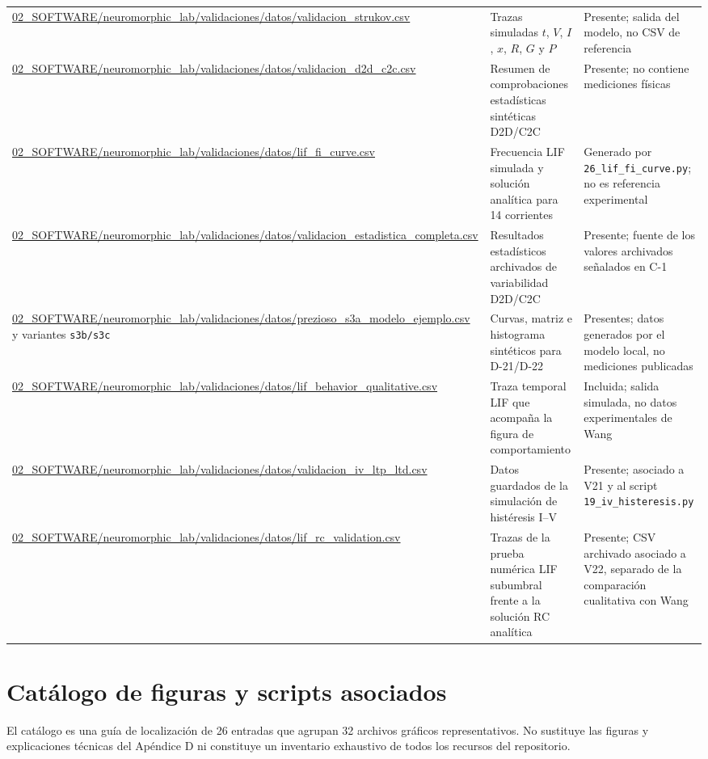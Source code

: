 \begin{longtable}{>{\raggedright\arraybackslash}p{3.8cm} >{\raggedright\arraybackslash}p{4.4cm} >{\raggedright\arraybackslash}p{5.2cm}}
\url{02_SOFTWARE/neuromorphic_lab/validaciones/datos/validacion_strukov.csv} &
Trazas simuladas $t$, $V$, $I$, $x$, $R$, $G$ y $P$ &
Presente; salida del modelo, no CSV de referencia \\
\url{02_SOFTWARE/neuromorphic_lab/validaciones/datos/validacion_d2d_c2c.csv} &
Resumen de comprobaciones estadísticas sintéticas D2D/C2C &
Presente; no contiene mediciones físicas \\
\url{02_SOFTWARE/neuromorphic_lab/validaciones/datos/lif_fi_curve.csv} &
Frecuencia LIF simulada y solución analítica para 14 corrientes &
Generado por \texttt{26\_lif\_fi\_curve.py}; no es referencia experimental \\
\url{02_SOFTWARE/neuromorphic_lab/validaciones/datos/validacion_estadistica_completa.csv} &
Resultados estadísticos archivados de variabilidad D2D/C2C &
Presente; fuente de los valores archivados señalados en C-1 \\
\url{02_SOFTWARE/neuromorphic_lab/validaciones/datos/prezioso_s3a_modelo_ejemplo.csv} y variantes \texttt{s3b/s3c} &
Curvas, matriz e histograma sintéticos para D-21/D-22 &
Presentes; datos generados por el modelo local, no mediciones publicadas \\
\url{02_SOFTWARE/neuromorphic_lab/validaciones/datos/lif_behavior_qualitative.csv} &
Traza temporal LIF que acompaña la figura de comportamiento &
Incluida; salida simulada, no datos experimentales de Wang \\
\url{02_SOFTWARE/neuromorphic_lab/validaciones/datos/validacion_iv_ltp_ltd.csv} &
Datos guardados de la simulación de histéresis I--V &
Presente; asociado a V21 y al script \texttt{19\_iv\_histeresis.py} \\
\url{02_SOFTWARE/neuromorphic_lab/validaciones/datos/lif_rc_validation.csv} &
Trazas de la prueba numérica LIF subumbral frente a la solución RC analítica &
Presente; CSV archivado asociado a V22, separado de la comparación cualitativa con Wang \\
\end{longtable}
\endgroup

\section{Catálogo de figuras y scripts asociados}
\label{sec:catalogo_figuras}

El catálogo es una guía de localización de 26 entradas que agrupan 32
archivos gráficos representativos. No sustituye las figuras y explicaciones
técnicas del Apéndice D ni constituye un inventario exhaustivo de todos los
recursos del repositorio.

